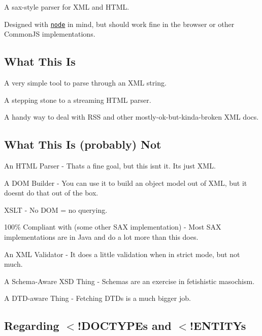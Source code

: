 A sax-\/style parser for X\+ML and H\+T\+ML.

Designed with \href{http://nodejs.org/}{\tt node} in mind, but should work fine in the browser or other Common\+JS implementations.

\subsection*{What This Is}


\begin{DoxyItemize}
\item A very simple tool to parse through an X\+ML string.
\item A stepping stone to a streaming H\+T\+ML parser.
\item A handy way to deal with R\+SS and other mostly-\/ok-\/but-\/kinda-\/broken X\+ML docs.
\end{DoxyItemize}

\subsection*{What This Is (probably) Not}


\begin{DoxyItemize}
\item An H\+T\+ML Parser -\/ That\textquotesingle{}s a fine goal, but this isn\textquotesingle{}t it. It\textquotesingle{}s just X\+ML.
\item A D\+OM Builder -\/ You can use it to build an object model out of X\+ML, but it doesn\textquotesingle{}t do that out of the box.
\item X\+S\+LT -\/ No D\+OM = no querying.
\item 100\% Compliant with (some other S\+AX implementation) -\/ Most S\+AX implementations are in Java and do a lot more than this does.
\item An X\+ML Validator -\/ It does a little validation when in strict mode, but not much.
\item A Schema-\/\+Aware X\+SD Thing -\/ Schemas are an exercise in fetishistic masochism.
\item A D\+T\+D-\/aware Thing -\/ Fetching D\+T\+Ds is a much bigger job.
\end{DoxyItemize}

\subsection*{Regarding {\ttfamily $<$!\+D\+O\+C\+T\+Y\+PE}s and {\ttfamily $<$!\+E\+N\+T\+I\+TY}s}

